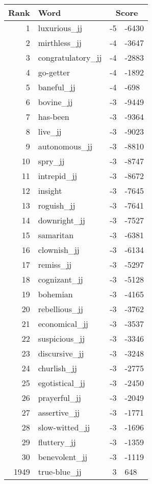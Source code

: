 \begin{longtable}[!htbp]{| rlr@{.}l |}
    \hline
    \textbf{Rank} & \textbf{Word} & \multicolumn{2}{c|}{\textbf{Score}} \\
    \hline
    \endhead
    1 & luxurious\_jj & -5 & -6430 \\
    2 & mirthless\_jj & -4 & -3647 \\
    3 & congratulatory\_jj & -4 & -2883 \\
    4 & go-getter & -4 & -1892 \\
    5 & baneful\_jj & -4 & -698 \\
    6 & bovine\_jj & -3 & -9449 \\
    7 & has-been & -3 & -9364 \\
    8 & live\_jj & -3 & -9023 \\
    9 & autonomous\_jj & -3 & -8810 \\
    10 & spry\_jj & -3 & -8747 \\
    11 & intrepid\_jj & -3 & -8672 \\
    12 & insight & -3 & -7645 \\
    13 & roguish\_jj & -3 & -7641 \\
    14 & downright\_jj & -3 & -7527 \\
    15 & samaritan & -3 & -6381 \\
    16 & clownish\_jj & -3 & -6134 \\
    17 & remiss\_jj & -3 & -5297 \\
    18 & cognizant\_jj & -3 & -5128 \\
    19 & bohemian & -3 & -4165 \\
    20 & rebellious\_jj & -3 & -3762 \\
    21 & economical\_jj & -3 & -3537 \\
    22 & suspicious\_jj & -3 & -3346 \\
    23 & discursive\_jj & -3 & -3248 \\
    24 & churlish\_jj & -3 & -2775 \\
    25 & egotistical\_jj & -3 & -2450 \\
    26 & prayerful\_jj & -3 & -2049 \\
    27 & assertive\_jj & -3 & -1771 \\
    28 & slow-witted\_jj & -3 & -1696 \\
    29 & fluttery\_jj & -3 & -1359 \\
    30 & benevolent\_jj & -3 & -1119 \\
    1949 & true-blue\_jj & 3 & 648 \\

\end{longtable}
